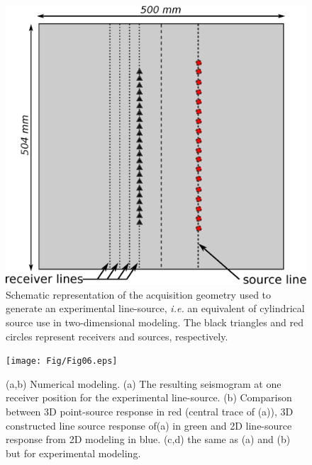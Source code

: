 \documentclass[extra,mreferee]{gji}
\newcommand{\bialt}{\textit{BiAlt} }
\begin{document}
\clearpage
\newpage


\clearpage
\newpage

\begin{figure}
\centering
\includegraphics[width=0.50\columnwidth]{Fig/Fig05.eps}
\caption{Schematic representation of the acquisition geometry used to generate an experimental line-source, \textit{i.e.} an equivalent of cylindrical source use in two-dimensional modeling. The black triangles and red circles represent receivers and sources, respectively.}
\label{Fig:Fig05}
\end{figure}

\clearpage
\newpage

\begin{figure}
\centering
\texttt{[image: Fig/Fig06.eps]}
\caption{(a,b) Numerical modeling. (a) The resulting seismogram at one receiver position for the experimental line-source. (b) Comparison between 3D point-source response in red (central trace of (a)), 3D constructed line source response of(a) in green and 2D line-source response from 2D modeling in blue. (c,d) the same as (a) and (b) but for experimental modeling.}
\label{Fig:Fig06}
\end{figure}

\clearpage
\newpage
\end{document}
